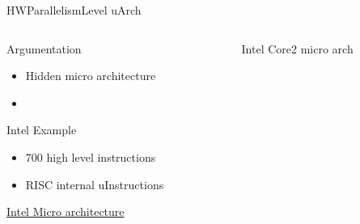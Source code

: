 %
\begin{Frame}{HWParallelismLevel uArch}
  \begin{columns}[t]
    \begin{column}{\HW} %
      \begin{block}{Argumentation}
        \begin{itemize}
        \item Hidden micro architecture
        \item 
        \end{itemize}
      \end{block} 
      \begin{block}{Intel Example}
        \begin{itemize}
        \item 700 high level instructions
        \item RISC internal uInstructions
        \end{itemize}
        \href{https://en.wikipedia.org/wiki/Microarchitecture}{Intel
          Micro architecture}
      \end{block}   
    \end{column}
    
    \begin{column}{\HW} %
      \begin{block}{Intel Core2 micro arch}
      \end{block}
    \end{column}
  \end{columns}  
\end{Frame}


